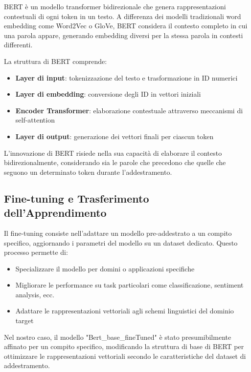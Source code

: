 \documentclass{article}
\begin{document}
BERT è un modello transformer bidirezionale che genera rappresentazioni contestuali di ogni token in un testo. A differenza dei modelli tradizionali word embedding come Word2Vec o GloVe, BERT considera il contesto completo in cui una parola appare, generando embedding diversi per la stessa parola in contesti differenti.

La struttura di BERT comprende:

\begin{itemize}
    \item \textbf{Layer di input}: tokenizzazione del testo e trasformazione in ID numerici
    \item \textbf{Layer di embedding}: conversione degli ID in vettori iniziali
    \item \textbf{Encoder Transformer}: elaborazione contestuale attraverso meccanismi di self-attention
    \item \textbf{Layer di output}: generazione dei vettori finali per ciascun token
\end{itemize}

L'innovazione di BERT risiede nella sua capacità di elaborare il contesto bidirezionalmente, considerando sia le parole che precedono che quelle che seguono un determinato token durante l'addestramento.

\subsection{Fine-tuning e Trasferimento dell'Apprendimento}

Il fine-tuning consiste nell'adattare un modello pre-addestrato a un compito specifico, aggiornando i parametri del modello su un dataset dedicato. Questo processo permette di:

\begin{itemize}
    \item Specializzare il modello per domini o applicazioni specifiche
    \item Migliorare le performance su task particolari come classificazione, sentiment analysis, ecc.
    \item Adattare le rappresentazioni vettoriali agli schemi linguistici del dominio target
\end{itemize}

Nel nostro caso, il modello "Bert\_base\_fineTuned" è stato presumibilmente affinato per un compito specifico, modificando la struttura di base di BERT per ottimizzare le rappresentazioni vettoriali secondo le caratteristiche del dataset di addestramento.
\end{document}

